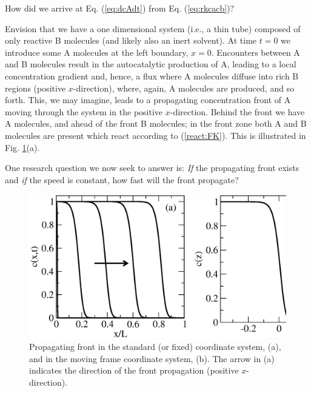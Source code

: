 \begin{question}
	How did we arrive at Eq. (\ref{eq:dcAdt}) from Eq. (\ref{eq:rkcacb})?
\end{question}


Envision that we have a one dimensional system (i.e., a thin tube) 
composed of only reactive B molecules (and likely also an inert solvent). At time $t=0$
we introduce some A molecules at the left boundary, $x=0$. Encounters between A and B
molecules result in the autocatalytic production of A, leading to a local concentration
gradient and, hence, a flux where A molecules diffuse into rich B regions (positive $x$-direction),
where, again, A molecules are produced, and so forth. This, we may imagine,
leads to a propagating concentration front of A moving through the
system in the positive $x$-direction. Behind the front we have A molecules, and ahead of the front B
molecules; in the front zone both A and B molecules are present which react
according to (\ref{react:FK}). This is illustrated in Fig. \ref{fig:fronts}(a). 

One research question we now seek to answer is: \emph{If} the propagating front exists
and \emph{if} the speed is constant, how fast will the front propagate?

\begin{figure}
  \begin{center}
    \includegraphics[scale=0.4]{figs/FK-wavefront}
    \caption{\label{fig:fronts}
	  Propagating front in the standard (or fixed) coordinate system, (a), and in the
	  moving frame coordinate system, (b). The arrow in (a) indicates the direction of the 
	  front propagation (positive $x$-direction).
    }
  \end{center}
\end{figure}

